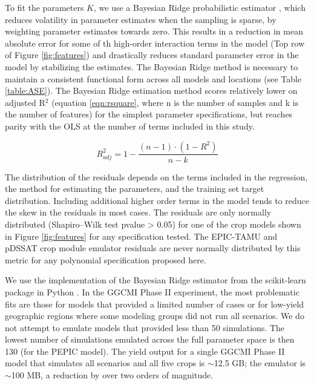 \documentclass[gmd, manuscript]{copernicus} %
\begin{document}
To fit the parameters $K$, we use a Bayesian Ridge probabilistic estimator \citep{MacKay91}, which reduces volatility in parameter estimates when the sampling is sparse, by weighting parameter estimates towards zero. 
This results in a reduction in mean absolute error for some of th high-order interaction terms in the model (Top row of Figure \ref{fig:features}) and drastically reduces standard parameter error in the model by stabilizing the estimates.
The Bayesian Ridge method is necessary to maintain a consistent functional form across all models and locations (see Table \ref{table:ASE}). The Bayesian Ridge estimation method scores relatively lower on adjusted R$^2$ (equation \ref{eqn:rsquare}, where n is the number of samples and k is the number of features) for the simplest parameter specifications, but reaches parity with the OLS at the number of terms included in this study.

\begin{equation}
    \label{eqn:rsquare}
    R^{2}_{adj} = 1 - \frac{(n-1) \cdot (1 - R^{2})}{n - k}
\end{equation}

The distribution of the residuals depends on the terms included in the regression, the method for estimating the parameters, and the training set target distribution. 
Including additional higher order terms in the model tends to reduce the skew in the residuals in most cases.
The residuals are only normally distributed (Shapiro–Wilk test \citep{Shapiro1965} pvalue > 0.05) for one of the crop models shown in Figure \ref{fig:features} for any specification tested. 
The EPIC-TAMU and pDSSAT crop module emulator residuals are never normally distributed by this metric for any polynomial specification proposed here. 

We use the implementation of the Bayesian Ridge estimator from the scikit-learn package in Python \citep{scikit-learn}. 
In the GGCMI Phase II experiment, the most problematic fits are those for models that provided a limited number of cases or for low-yield geographic regions where some modeling groups did not run all scenarios. 
We do not attempt to emulate models that provided less than 50 simulations. 
The lowest number of simulations emulated across the full parameter space is then 130 (for the PEPIC model). 
The yield output for a single GGCMI Phase II model that simulates all scenarios and all five crops is $\sim$12.5 GB; the emulator is $\sim$100 MB, a reduction by over two orders of magnitude. 

\end{document}
